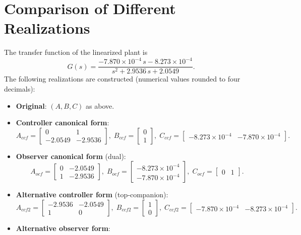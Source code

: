 \documentclass[12pt,a4paper]{article}
\begin{document}
\section{Comparison of Different Realizations}
The transfer function of the linearized plant is
\[
G(s) = \frac{-7.870\times10^{-4}\,s - 8.273\times10^{-4}}{s^2 + 2.9536\,s + 2.0549}.
\]
The following realizations are constructed (numerical values rounded to four decimals):
\begin{itemize}
    \item \textbf{Original}: $(A,B,C)$ as above.
    \item \textbf{Controller canonical form}:
    \[
    A_{ccf} = \begin{bmatrix} 0 & 1 \\ -2.0549 & -2.9536 \end{bmatrix},\;
    B_{ccf} = \begin{bmatrix} 0 \\ 1 \end{bmatrix},\;
    C_{ccf} = \begin{bmatrix} -8.273\times10^{-4} & -7.870\times10^{-4} \end{bmatrix}.
    \]
    \item \textbf{Observer canonical form} (dual):
    \[
    A_{ocf} = \begin{bmatrix} 0 & -2.0549 \\ 1 & -2.9536 \end{bmatrix},\;
    B_{ocf} = \begin{bmatrix} -8.273\times10^{-4} \\ -7.870\times10^{-4} \end{bmatrix},\;
    C_{ocf} = \begin{bmatrix} 0 & 1 \end{bmatrix}.
    \]
    \item \textbf{Alternative controller form} (top‑companion):
    \[
    A_{ccf2} = \begin{bmatrix} -2.9536 & -2.0549 \\ 1 & 0 \end{bmatrix},\;
    B_{ccf2} = \begin{bmatrix} 1 \\ 0 \end{bmatrix},\;
    C_{ccf2} = \begin{bmatrix} -7.870\times10^{-4} & -8.273\times10^{-4} \end{bmatrix}.
    \]
    \item \textbf{Alternative observer form}:

\end{itemize}
\end{document}
